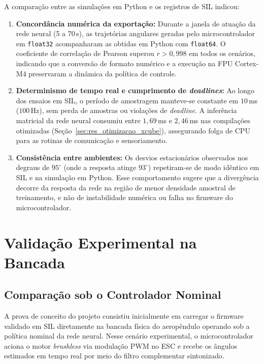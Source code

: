A comparação entre as simulações em Python e os registros de SIL indicou:
\begin{enumerate}
    \item \textbf{Concordância numérica da exportação:} Durante a janela de atuação da rede neural (5 a 70\,s), as trajetórias angulares geradas pelo microcontrolador em \texttt{float32} acompanharam as obtidas em Python com \texttt{float64}. O coeficiente de correlação de Pearson superou $r > 0{,}998$ em todos os cenários, indicando que a conversão de formato numérico e a execução na FPU Cortex-M4 preservaram a dinâmica da política de controle.
    
    \item \textbf{Determinismo de tempo real e cumprimento de \textit{deadlines}:} Ao longo dos ensaios em SIL, o período de amostragem manteve-se constante em $10$\,ms ($100$\,Hz), sem perda de amostras ou violações de \textit{deadline}. A inferência matricial da rede neural consumiu entre $1{,}69$\,ms e $2{,}46$\,ms nas compilações otimizadas (Seção~\ref{sec:res_otimizacao_xcube}), assegurando folga de CPU para as rotinas de comunicação e sensoriamento.
    
    \item \textbf{Consistência entre ambientes:} Os desvios estacionários observados nos degraus de $95^\circ$ (onde a resposta atinge $93^\circ$) repetiram-se de modo idêntico em SIL e na simulação em Python. Esse comportamento sugere que a divergência decorre da resposta da rede na região de menor densidade amostral de treinamento, e não de instabilidade numérica ou falha no firmware do microcontrolador.
\end{enumerate}


\section{Validação Experimental na Bancada}
\label{sec:res_bancada_vs_sil}

\subsection{Comparação sob o Controlador Nominal}
\label{sec:res_bancada}

A prova de conceito do projeto consistiu inicialmente em carregar o firmware validado em SIL diretamente na bancada física do aeropêndulo operando sob a política nominal da rede neural. Nesse cenário experimental, o microcontrolador aciona o motor \textit{brushless} via modulação PWM no ESC e recebe os ângulos estimados em tempo real por meio do filtro complementar sintonizado.

